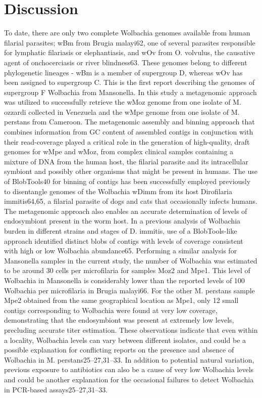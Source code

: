 \documentclass[10pt, a4paper, twocolumn]{article} %
\begin{document}
\section{Discussion}
To date, there are only two complete Wolbachia genomes available from human filarial parasites; wBm from Brugia malayi62, one of several parasites responsible for lymphatic filariasis or elephantiasis, and wOv from O. volvulus, the causative agent of onchocerciasis or river blindness63. These genomes belong to different phylogenetic lineages - wBm is a member of supergroup D, whereas wOv has been assigned to supergroup C. This is the first report describing the genomes of supergroup F Wolbachia from Mansonella. In this study a metagenomic approach was utilized to successfully retrieve the wMoz genome from one isolate of M. ozzardi collected in Venezuela and the wMpe genome from one isolate of M. perstans from Cameroon. The metagenomic assembly and binning approach that combines information from GC content of assembled contigs in conjunction with their read-coverage played a critical role in the generation of high-quality, draft genomes for wMpe and wMoz, from complex clinical samples containing a mixture of DNA from the human host, the filarial parasite and its intracellular symbiont and possibly other organisms that might be present in humans. The use of BlobTools40 for binning of contigs has been successfully employed previously to disentangle genomes of the Wolbachia wDimm from its host Dirofilaria immitis64,65, a filarial parasite of dogs and cats that occasionally infects humans. 
The metagenomic approach also enables an accurate determination of levels of endosymbiont present in the worm host. In a previous analysis of Wolbachia burden in different strains and stages of D. immitis, use of a BlobTools-like approach identified distinct blobs of contigs with levels of coverage consistent with high or low Wolbachia abundance65. Performing a similar analysis for Mansonella samples in the current study, the number of Wolbachia was estimated to be around 30 cells per microfilaria for samples Moz2 and Mpe1. This level of Wolbachia in Mansonella is considerably lower than the reported levels of 100 Wolbachia per microfilaria in Brugia malayi66. For the other M. perstans sample Mpe2 obtained from the same geographical location as Mpe1, only 12 small contigs corresponding to Wolbachia were found at very low coverage, demonstrating that the endosymbiont was present at extremely low levels, precluding accurate titer estimation. These observations indicate that even within a locality, Wolbachia levels can vary between different isolates, and could be a possible explanation for conflicting reports on the presence and absence of Wolbachia in M. perstans25–27,31–33. In addition to potential natural variation, previous exposure to antibiotics can also be a cause of very low Wolbachia levels and could be another explanation for the occasional failures to detect Wolbachia in PCR-based assays25–27,31–33. 
\end{document}
